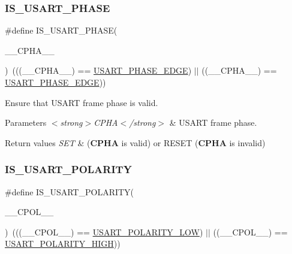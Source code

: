 \subsubsection{\texorpdfstring{I\+S\+\_\+\+U\+S\+A\+R\+T\+\_\+\+P\+H\+A\+SE}{IS\_USART\_PHASE}}
{\footnotesize\ttfamily \#define I\+S\+\_\+\+U\+S\+A\+R\+T\+\_\+\+P\+H\+A\+SE(\begin{DoxyParamCaption}\item[{}]{\+\_\+\+\_\+\+C\+P\+H\+A\+\_\+\+\_\+ }\end{DoxyParamCaption})~(((\+\_\+\+\_\+\+C\+P\+H\+A\+\_\+\+\_\+) == \hyperlink{group___u_s_a_r_t___clock___phase_gab050873df3eb3844f973e61681e02e6a}{U\+S\+A\+R\+T\+\_\+\+P\+H\+A\+S\+E\+\_\+E\+D\+GE}) $\vert$$\vert$ ((\+\_\+\+\_\+\+C\+P\+H\+A\+\_\+\+\_\+) == \hyperlink{group___u_s_a_r_t___clock___phase_ga080cff411c6cefbb511162fcc91c43ec}{U\+S\+A\+R\+T\+\_\+\+P\+H\+A\+S\+E\+\_\+E\+D\+GE}))}



Ensure that U\+S\+A\+RT frame phase is valid. 


\begin{DoxyParams}{Parameters}
{\em $<$strong$>$\+C\+P\+H\+A$<$/strong$>$} & U\+S\+A\+RT frame phase. \\
\hline
\end{DoxyParams}

\begin{DoxyRetVals}{Return values}
{\em S\+ET} & ({\bfseries C\+P\+HA} is valid) or R\+E\+S\+ET ({\bfseries C\+P\+HA} is invalid) \\
\hline
\end{DoxyRetVals}
\mbox{\label{group___u_s_a_r_t___private___macros_gadf1beba58ae096520a8b3807cfa660b1}} 
\subsubsection{\texorpdfstring{I\+S\+\_\+\+U\+S\+A\+R\+T\+\_\+\+P\+O\+L\+A\+R\+I\+TY}{IS\_USART\_POLARITY}}
{\footnotesize\ttfamily \#define I\+S\+\_\+\+U\+S\+A\+R\+T\+\_\+\+P\+O\+L\+A\+R\+I\+TY(\begin{DoxyParamCaption}\item[{}]{\+\_\+\+\_\+\+C\+P\+O\+L\+\_\+\+\_\+ }\end{DoxyParamCaption})~(((\+\_\+\+\_\+\+C\+P\+O\+L\+\_\+\+\_\+) == \hyperlink{group___u_s_a_r_t___clock___polarity_ga5afb62c05704ca0e750ca8f4bb5ccc7d}{U\+S\+A\+R\+T\+\_\+\+P\+O\+L\+A\+R\+I\+T\+Y\+\_\+\+L\+OW}) $\vert$$\vert$ ((\+\_\+\+\_\+\+C\+P\+O\+L\+\_\+\+\_\+) == \hyperlink{group___u_s_a_r_t___clock___polarity_ga3b3e3d798d4797a220346f6b14d257ee}{U\+S\+A\+R\+T\+\_\+\+P\+O\+L\+A\+R\+I\+T\+Y\+\_\+\+H\+I\+GH}))}



